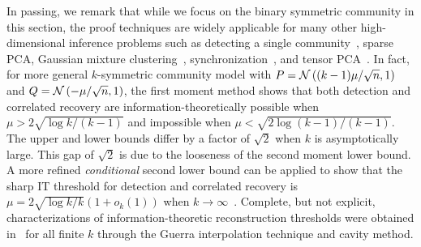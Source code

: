 



\medskip
In passing, we remark that while we focus on the binary symmetric community in this section, the proof techniques are widely applicable 
for many other high-dimensional inference problems such as detecting a single community~\cite{arias2013community}, 
sparse PCA, Gaussian mixture clustering~\cite{Banks16},
synchronization~\cite{PerryWeinBandeiraMoitra16}, and tensor PCA~\cite{PerryWeinBandeira16}. 
In fact, for more general $k$-symmetric community model with $P={\mathcal{N}}\left((k-1)\mu/\sqrt{n},1\right)$
and $Q={\mathcal{N}}\left(-\mu/\sqrt{n},1\right)$, the first moment method shows that both
detection and correlated recovery are information-theoretically possible when $\mu > 2 \sqrt{\log k/(k-1)}$ and
impossible when $\mu< \sqrt{2 \log (k-1)/(k-1)}$. The upper and lower bounds differ by a factor of $\sqrt{2}$ when $k$ is asymptotically
large. This gap of $\sqrt{2}$ is due to the looseness of the second moment lower bound. 
A more refined \emph{conditional} second lower
bound can be applied to show that the sharp IT threshold for detection and correlated recovery is 
$\mu=2\sqrt{\log k/k}(1+o_k(1))$ 
when $k\to \infty$~\cite{Banks16}. Complete, but not explicit, characterizations of information-theoretic reconstruction thresholds were obtained in~\cite{KrzakalaXuZdeborova16,Barbier16,LelargeMiolane16} for all finite $k$ through the Guerra interpolation technique and cavity method.



